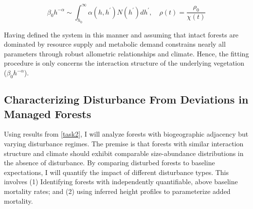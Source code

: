 \begin{equation}
    \beta_{0}h^{-\alpha} \sim \int_{h_{0}}^{\infty} \alpha(h, h^{\prime})N(h^{\prime})dh^{\prime}, \quad \rho(t) = \dfrac{\rho_{0}}{\chi(t)}
\end{equation}


Having defined the system in this manner and assuming that intact forests are dominated by resource supply and metabolic demand constrains nearly all parameters through robust allometric relationships and climate. Hence, the fitting procedure is only concerns the interaction structure of the underlying vegetation ($\beta_{0}h^{-\alpha}$).

\subsection{Characterizing Disturbance From Deviations in Managed Forests}
\label{task3}

Using results from \ref{task2}, I will analyze forests with biogeographic adjacency but varying disturbance regimes. The premise is that forests with similar interaction structure and climate should exhibit comparable size-abundance distributions in the absence of disturbance. By comparing disturbed forests to baseline expectations, I will quantify the impact of different disturbance types. This involves (1) Identifying forests with independently quantifiable, above baseline mortality rates; and (2) using inferred height profiles to parameterize added mortality.



